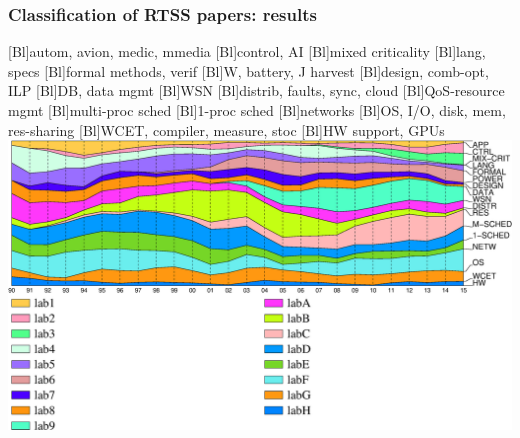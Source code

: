 \documentclass[ignorenonframetext,mathserif]{beamer} %
\begin{document}
\begin{frame}
  \frametitle{Classification of RTSS papers: results}
  \begin{center}
    [Bl]{\small autom, avion, medic, mmedia}
    [Bl]{\small control, AI}
    [Bl]{\small mixed criticality}
    [Bl]{\small lang, specs}
    [Bl]{\small formal methods, verif}
    [Bl]{\small W, battery, J harvest}
    [Bl]{\small design, comb-opt, ILP}
    [Bl]{\small DB, data mgmt}
    [Bl]{\small WSN}
    [Bl]{\small distrib, faults, sync, cloud}
    [Bl]{\small QoS-resource mgmt}
    [Bl]{\small multi-proc sched}
    [Bl]{\small 1-proc sched}
    [Bl]{\small networks}
    [Bl]{\small OS, I/O, disk, mem, res-sharing}
    [Bl]{\small WCET, compiler, measure, stoc}
    [Bl]{\small HW support, GPUs}
    \includegraphics[scale=.34]{figs/topicsRT_2015}
  \end{center}


\end{frame}
\end{document}
